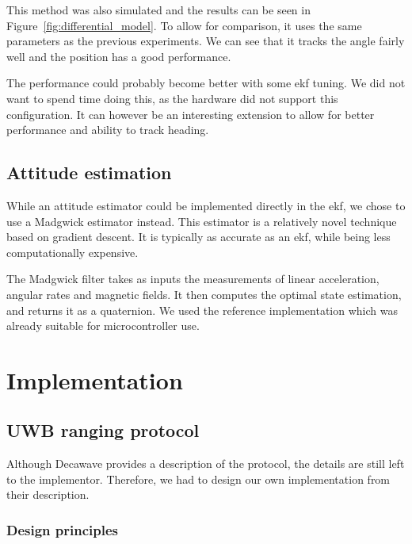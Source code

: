 \documentclass[a4paper, 12pt]{scrreprt}
\begin{document}
This method was also simulated and the results can be seen in Figure~\ref{fig:differential_model}.
To allow for comparison, it uses the same parameters as the previous experiments.
We can see that it tracks the angle fairly well and the position has a good performance.

The performance could probably become better with some \gls{ekf} tuning.
We did not want to spend time doing this, as the hardware did not support this configuration.
It can however be an interesting extension to allow for better performance and ability to track heading.

\section{Attitude estimation}

While an attitude estimator could be implemented directly in the \gls{ekf}, we chose to use a Madgwick estimator instead.
This estimator is a relatively novel technique based on gradient descent.
It is typically as accurate as an \gls{ekf}, while being less computationally expensive\cite{madgwick2011estimation}.

The Madgwick filter takes as inputs the measurements of linear acceleration, angular rates and magnetic fields.
It then computes the optimal state estimation, and returns it as a quaternion.
We used the reference implementation\cite{madgwick2011estimation} which was already suitable for microcontroller use.

\chapter{Implementation}

\section{UWB ranging protocol}

Although Decawave provides a description of the protocol\cite{dw1000manual}, the details are still left to the implementor.
Therefore, we had to design our own implementation from their description. 

\subsection{Design principles}
\end{document}
